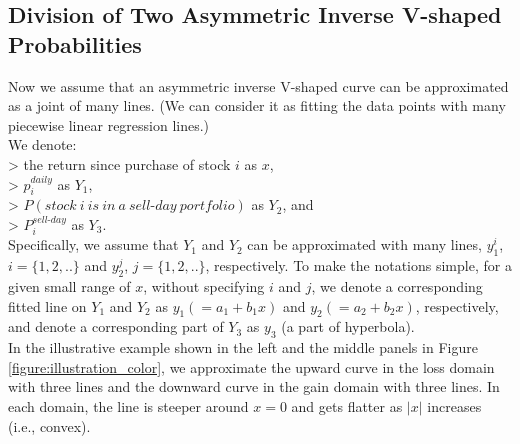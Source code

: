 \documentclass[11pt, a4paper]{article}
\begin{document}

\subsection{Division of Two Asymmetric Inverse V-shaped Probabilities}
\label{section:division_two_inverse_v}

Now we assume that an asymmetric inverse V-shaped curve can be approximated as a joint of many lines. (We can consider it as fitting the data points with many piecewise linear regression lines.)\\

\noindent
We denote:\\
> the return since purchase of stock $i$ as $x$, \\
> $p^{daily}_{i}$ as $Y_1$,\\
> $P(stock~i~is~in~a~sell\mbox{-}day~portfolio)$ as $Y_2$, and \\
> $P^{sell\mbox{-}day}_{i}$ as $Y_3$.\\

\noindent
Specifically, we assume that $Y_1$ and $Y_2$ can be approximated with many lines, $y^i_1$, $i=\{1,2,..\}$ and $y^j_2$, $j=\{1,2,..\}$, respectively.
To make the notations simple, for a given small range of $x$, without specifying $i$ and $j$, we denote a corresponding fitted line on $Y_1$ and $Y_2$ as $y_1(=a_1+b_1x)$ and $y_2(=a_2+b_2x)$, respectively, and denote a corresponding part of $Y_3$ as $y_3$ (a part of hyperbola).\\


\noindent
In the illustrative example shown in the left and the middle panels in Figure \ref{figure:illustration_color}, we approximate the upward curve in the loss domain with three lines and the downward curve in the gain domain with three lines. In each domain, the line is steeper around $x=0$ and gets flatter as $|x|$ increases (i.e., convex).\\
\end{document}
